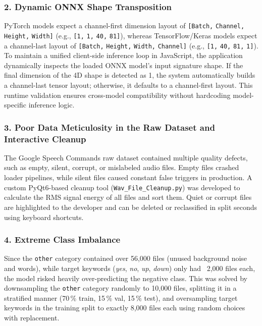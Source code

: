 \documentclass[11pt,a4paper]{article}
\begin{document}
\subsubsection{2. Dynamic ONNX Shape Transposition}
PyTorch models expect a channel-first dimension layout of \texttt{[Batch,} \texttt{Channel,} \texttt{Height,} \texttt{Width]} (e.g., \texttt{[1,} \texttt{1,} \texttt{40,} \texttt{81]}), whereas TensorFlow/Keras models expect a channel-last layout of \texttt{[Batch,} \texttt{Height,} \texttt{Width,} \texttt{Channel]} (e.g., \texttt{[1,} \texttt{40,} \texttt{81,} \texttt{1]}). To maintain a unified client-side inference loop in JavaScript, the application dynamically inspects the loaded ONNX model's input signature shape. If the final dimension of the 4D shape is detected as 1, the system automatically builds a channel-last tensor layout; otherwise, it defaults to a channel-first layout. This runtime validation ensures cross-model compatibility without hardcoding model-specific inference logic.

\subsubsection{3. Poor Data Meticulosity in the Raw Dataset and Interactive Cleanup}
The Google Speech Commands raw dataset contained multiple quality defects, such as empty, silent, corrupt, or mislabeled audio files. Empty files crashed loader pipelines, while silent files caused constant false triggers in production. A custom PyQt6-based cleanup tool (\texttt{Wav\_File\_\allowbreak Cleanup.py}) was developed to calculate the RMS signal energy of all files and sort them. Quiet or corrupt files are highlighted to the developer and can be deleted or reclassified in split seconds using keyboard shortcuts.

\subsubsection{4. Extreme Class Imbalance}
Since the \texttt{other} category contained over 56,000 files (unused background noise and words), while target keywords (\textit{yes}, \textit{no}, \textit{up}, \textit{down}) only had ~2,000 files each, the model risked heavily over-predicting the negative class. This was solved by downsampling the \texttt{other} category randomly to 10,000 files, splitting it in a stratified manner (70\,\% train, 15\,\% val, 15\,\% test), and oversampling target keywords in the training split to exactly 8,000 files each using random choices with replacement.
\end{document}
